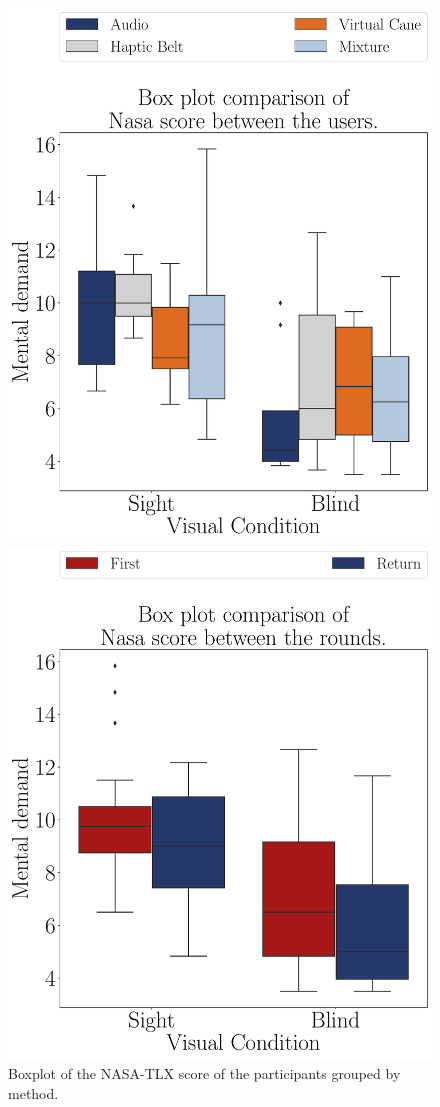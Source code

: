 \begin{figure}[!htb]
    \centering
    \begin{minipage}{0.45\textwidth}
        \centering
        \includegraphics[width = 0.8\linewidth]{Resultados/Nasa/Figuras/pdf/boxplot_noBase_nasa_4_scene.pdf}
        \caption{Boxplot of the NASA-TLX score of the participants grouped by method.}
        \label{fig:boxplot_noBase_nasa_4_scene}
    \end{minipage}
    \begin{minipage}{0.075\textwidth}
        \hfill
    \end{minipage}
    \begin{minipage}{0.45\textwidth}
        \centering
        \includegraphics[width = 0.8\linewidth]{Resultados/Nasa/Figuras/pdf/boxplot_noBase_nasa_4_rounds.pdf}

\end{minipage}
\end{figure}
